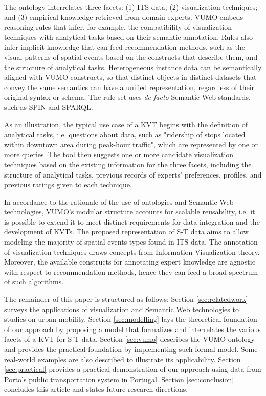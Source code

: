 \documentclass[]{interact}
\theoremstyle{plain}%
\theoremstyle{definition}
\theoremstyle{remark}
\theoremstyle{definition}
\begin{document}
The ontology interrelates three facets: (1) ITS data; (2) visualization techniques; and (3) empirical knowledge retrieved from domain experts. VUMO embeds reasoning rules that infer, for example, the compatibility of visualization techniques with analytical tasks based on their semantic annotation. Rules also infer implicit knowledge that can feed recommendation methods, such as the visual patterns of spatial events based on the constructs that describe them, and the structure of analytical tasks. Heterogeneous instance data can be semantically aligned with VUMO constructs, so that distinct objects in distinct datasets that convey the same semantics can have a unified representation, regardless of their original syntax or schema. The rule set uses \emph{de facto} Semantic Web standards, such as SPIN and SPARQL.

As an illustration, the typical use case of a KVT begins with the definition of analytical tasks, i.e. questions about data, such as "ridership of stops located within downtown area during peak-hour traffic", which are represented by one or more queries. The tool then suggests one or more candidate visualization techniques based on the existing information for the three facets, including the structure of analytical tasks, previous records of experts' preferences, profiles, and previous ratings given to each technique.

In accordance to the rationale of the use of ontologies and Semantic Web technologies, VUMO's modular structure accounts for scalable reusability, i.e. it is possible to extend it to meet distinct requirements for data integration and the development of KVTs. The proposed representation of S-T data aims to allow modeling the majority of spatial events types found in ITS data. The annotation of visualization techniques draws concepts from Information Visualization theory. Moreover, the available constructs for annotating expert knowledge are agnostic with respect to recommendation methods, hence they can feed a broad spectrum of such algorithms.

The remainder of this paper is structured as follows: Section \ref{sec:relatedwork} surveys the applications of visualization and Semantic Web technologies to studies on urban mobility. Section \ref{sec:modelling} lays the theoretical foundation of our approach by proposing a model that formalizes and interrelates the various facets of a KVT for S-T data. Section \ref{sec:vumo} describes the VUMO ontology and provides the practical foundation by implementing such formal model. Some real-world examples are also described to illustrate its applicability. Section \ref{sec:practical} provides a practical demonstration of our approach using data from Porto's public transportation system in Portugal. Section \ref{sec:conclusion} concludes this article and states future research directions.
\end{document}

